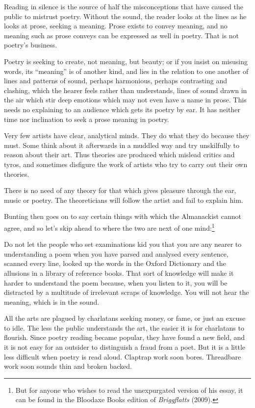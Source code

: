 \documentclass[0main.tex]{subfiles}
\begin{document}
{\footnotesize Reading in silence is the source of half the misconceptions that have caused the public to mistrust poetry. Without the sound, the reader looks at the lines as he looks at prose, seeking a meaning. Prose exists to convey meaning, and no meaning such as prose conveys can be expressed as well in poetry. That is not poetry's business.}

{\footnotesize Poetry is seeking to create, not meaning, but beauty; or if you insist on misusing words, its ``meaning'' is of another kind, and lies in the relation to one another of lines and patterns of sound, perhaps harmonious, perhaps contrasting and clashing, which the hearer feels rather than understands, lines of sound drawn in the air which stir deep emotions which may not even have a name in prose. This needs no explaining to an audience which gets its poetry by ear. It has neither time nor inclination to seek a prose meaning in poetry.}

{\footnotesize Very few artists have clear, analytical minds. They do what they do because they must. Some think about it afterwards in a muddled way and try unskilfully to reason about their art. Thus theories are produced which mislead critics and tyros, and sometimes disfigure the work of artists who try to carry out their own theories.}

{\footnotesize There is no need of any theory for that which gives pleasure through the ear, music or poetry. The theoreticians will follow the artist and fail to explain him.}
\bigskip
  
Bunting then goes on to say certain things with which the Almanackist cannot agree, and so let's skip ahead to where the two are next of one mind:\footnote{But for anyone who wishes to read the unexpurgated version of his essay, it can be found in the Bloodaxe Books edition of \emph{Briggflatts} (2009).}
  
\bigskip
{\footnotesize Do not let the people who set examinations kid you that you are any nearer to understanding a poem when you have parsed and analysed every sentence, scanned every line, looked up the words in the Oxford Dictionary and the allusions in a library of reference books. That sort of knowledge will make it harder to understand the poem because, when you listen to it, you will be distracted by a multitude of irrelevant scraps of knowledge. You will not hear the meaning, which is in the sound.}

{\footnotesize All the arts are plagued by charlatans seeking money, or fame, or just an excuse to idle. The less the public understands the art, the easier it is for charlatans to flourish. Since poetry reading became popular, they have found a new field, and it is not easy for an outsider to distinguish a fraud from a poet. But it is a little less difficult when poetry is read aloud. Claptrap work soon bores. Threadbare work soon sounds thin and broken backed.}
\end{document}
